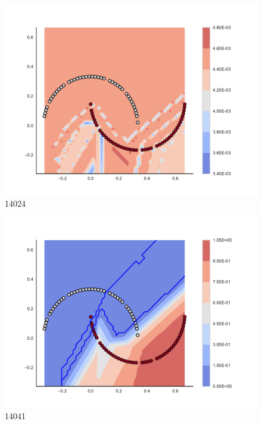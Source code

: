 \begin{subfigure}[b]{0.09\textwidth}
    \includegraphics[width=\textwidth]{img/convergence/14024.pdf}
    \caption{14024}
    \label{fig:convergence_14024}
\end{subfigure}
%
\begin{subfigure}[b]{0.09\textwidth}
    \includegraphics[width=\textwidth]{img/convergence/14041.pdf}
    \caption{14041}
    \label{fig:convergence_14041}
\end{subfigure}
%
